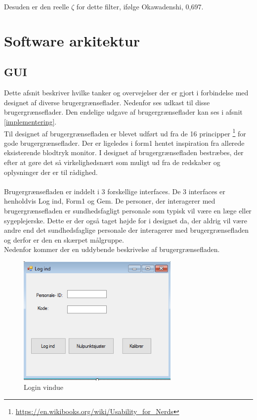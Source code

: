 Desuden er den reelle $\zeta$ for dette filter, ifølge Okawadenshi, 0,697.
\section{Software arkitektur}
\subsection{GUI}
Dette afsnit beskriver hvilke tanker og overvejelser der er gjort i forbindelse med designet af diverse brugergrænseflader. Nedenfor ses udkast til disse brugergrænseflader. Den endelige udgave af brugergrænseflader kan ses i afsnit \ref{implementering}.\\
Til designet af brugergrænsefladen er blevet udført ud fra de 16 principper \footnote{\url{https://en.wikibooks.org/wiki/Usability_for_Nerds}} for gode brugergrænseflader. Der er ligeledes i form1 hentet inspiration fra allerede eksisterende blodtryk monitor. I designet af brugergrænsefladen bestræbes, der efter at gøre det så virkelighedsnært som muligt ud fra de redskaber og oplysninger der er til rådighed.\\ \\
Brugergrænsefladen er inddelt i 3 forskellige interfaces. De 3 interfaces er henholdvis Log ind, Form1 og Gem. De personer, der interagerer med brugergrænsefladen er sundhedsfagligt personale som typisk vil være en læge eller sygeplejerske. Dette er der også taget højde for i designet da, der aldrig vil være andre end det sundhedsfaglige personale der interagerer med brugergrænsefladen og derfor er den en skærpet målgruppe.\\
Nedenfor kommer der en uddybende beskrivelse af brugergrænsefladen. 

\begin{figure}[H]
	\centering
	\includegraphics[width=0.7\textwidth]{Figurer/GUI/Logind_GUI}
	\caption{Login vindue}
	\label{Login vindue}
\end{figure}

